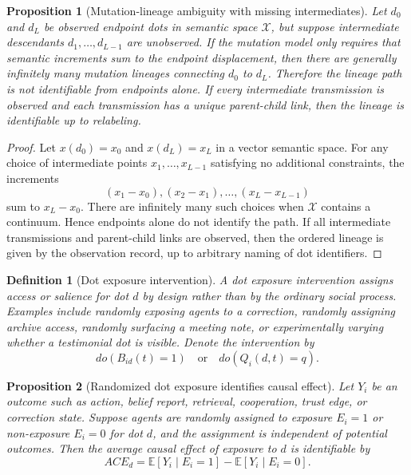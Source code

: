 \documentclass[11pt]{article}
\newtheorem{definition}{Definition}
\newtheorem{proposition}{Proposition}
\theoremstyle{remark}
\begin{document}
\begin{proposition}[Mutation-lineage ambiguity with missing intermediates]\label{prop:mutation-lineage-ambiguity}
Let $d_0$ and $d_L$ be observed endpoint dots in semantic space
$\mathcal X$, but suppose intermediate descendants
$d_1,\ldots,d_{L-1}$ are unobserved. If the mutation model only requires
that semantic increments sum to the endpoint displacement, then there
are generally infinitely many mutation lineages connecting $d_0$ to
$d_L$. Therefore the lineage path is not identifiable from endpoints
alone. If every intermediate transmission is observed and each
transmission has a unique parent-child link, then the lineage is
identifiable up to relabeling.
\end{proposition}

\begin{proof}
Let $x(d_0)=x_0$ and $x(d_L)=x_L$ in a vector semantic space. For any
choice of intermediate points $x_1,\ldots,x_{L-1}$ satisfying no
additional constraints, the increments
$$
(x_1-x_0),(x_2-x_1),\ldots,(x_L-x_{L-1})
$$
sum to $x_L-x_0$. There are infinitely many such choices when
$\mathcal X$ contains a continuum. Hence endpoints alone do not identify
the path. If all intermediate transmissions and parent-child links are
observed, then the ordered lineage is given by the observation record,
up to arbitrary naming of dot identifiers.
\end{proof}

\begin{definition}[Dot exposure intervention]\label{def:dot-exposure-intervention}
A dot exposure intervention assigns access or salience for dot $d$ by
design rather than by the ordinary social process. Examples include
randomly exposing agents to a correction, randomly assigning archive
access, randomly surfacing a meeting note, or experimentally varying
whether a testimonial dot is visible. Denote the intervention by
$$
do(B_{id}(t)=1)
\quad\text{or}\quad
 do(Q_i(d,t)=q).
$$
\end{definition}

\begin{proposition}[Randomized dot exposure identifies causal effect]\label{prop:randomized-dot-exposure-identification}
Let $Y_i$ be an outcome such as action, belief report, retrieval,
cooperation, trust edge, or correction state. Suppose agents are
randomly assigned to exposure $E_i=1$ or non-exposure $E_i=0$ for dot
$d$, and the assignment is independent of potential outcomes. Then the
average causal effect of exposure to $d$ is identifiable by
$$
ACE_d=\mathbb E[Y_i\mid E_i=1]-\mathbb E[Y_i\mid E_i=0].
$$
\end{proposition}
\end{document}
